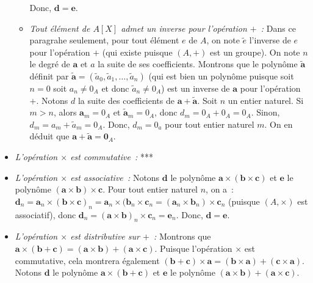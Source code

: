 \begin{itemize}[nosep]
\begin{itemize}[nosep]
                Donc, $\mathbf{d} = \mathbf{e}$.
            \item \textit{Tout élément de $A[X]$ admet un inverse pour l'opération $+$ :}
                Dans ce paragrahe seulement, pour tout élément $e$ de $A$, on note $\tilde{e}$ l'inverse de $e$ pour l'opération $+$ (qui existe puisque $(A, +)$ est un groupe). 
                On note $n$ le degré de $\mathbf{a}$ et $a$ la suite de ses coefficients. 
                Montrons que le polynôme $\tilde{\mathbf{a}}$ définit par $\tilde{\mathbf{a}} = (\tilde{a}_0, \tilde{a}_1, \dots, \tilde{a}_n)$ (qui est bien un polynôme puisque soit $n = 0$ soit $a_n \neq 0_A$ et donc $\tilde{a}_n \neq 0_A$) est un inverse de $\mathbf{a}$ pour l'opération $+$.
                Notons $d$ la suite des coefficients de $\mathbf{a} + \tilde{\mathbf{a}}$.
                Soit $n$ un entier naturel. 
                Si $m > n$, alors $\mathbf{a}_m = 0_A$ et $\tilde{\mathbf{a}}_m = 0_A$, donc $d_m = 0_A + 0_A = 0_A$.
                Sinon, $d_m = a_m + \tilde{a}_m = 0_A$.
                Donc, $d_m = 0_a$ pour tout entier naturel $m$.
                On en déduit que $\mathbf{a} + \tilde{\mathbf{a}} = \mathbf{0}_A$.
        \end{itemize}
    \item \textit{L'opération $\times$ est commutative :} 
        ***
    \item \textit{L'opération $\times$ est associative :}
        Notons $\mathbf{d}$ le polynôme $\mathbf{a} \times (\mathbf{b} \times \mathbf{c})$ et $\mathbf{e}$ le polynôme $(\mathbf{a} \times \mathbf{b}) \times \mathbf{c}$. 
        Pour tout entier naturel $n$, on a : $\mathbf{d}_n = \mathbf{a}_n \times (\mathbf{b} \times \mathbf{c})_n = \mathbf{a}_n \times (\mathbf{b}_n \times \mathbf{c}_n = (\mathbf{a}_n \times \mathbf{b}_n) \times \mathbf{c}_n$ (puisque $(A, \times)$ est associatif), donc $\mathbf{d}_n = (\mathbf{a} \times \mathbf{b})_n \times \mathbf{c}_n = \mathbf{e}_n$.
        Donc, $\mathbf{d} = \mathbf{e}$.
    \item \textit{L'opération $\times$ est distributive sur $+$ :} 
        Montrons que $\mathbf{a} \times (\mathbf{b} + \mathbf{c}) = (\mathbf{a} \times \mathbf{b}) + (\mathbf{a} \times \mathbf{c})$.
        Puisque l'opération $\times$ est commutative, cela montrera également $(\mathbf{b} + \mathbf{c}) \times \mathbf{a} = (\mathbf{b} \times \mathbf{a}) + (\mathbf{c} \times \mathbf{a})$.
        Notons $\mathbf{d}$ le polynôme $\mathbf{a} \times (\mathbf{b} + \mathbf{c})$ et $\mathbf{e}$ le polynôme $(\mathbf{a} \times \mathbf{b}) + (\mathbf{a} \times \mathbf{c})$.

\end{itemize}
